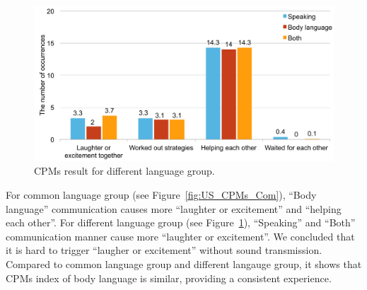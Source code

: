 \begin{figure}[!h]
\centering
\includegraphics[width=0.9\columnwidth]{Figures/US_CPMs_Dif.pdf}
\caption{CPMs result for different language group.}
\label{fig:US_CPMs_Dif}
\end{figure}

For common language group (see Figure~\ref{fig:US_CPMs_Com}),
``Body language'' communication causes more ``laughter or excitement'' and ``helping each other''.
For different language group (see Figure~\ref{fig:US_CPMs_Dif}), ``Speaking'' and ``Both'' communication manner cause more ``laughter or excitement''. We concluded that it is hard to trigger ``laugher or excitement'' without sound transmission. Compared to common language group and different langauge group, it shows that CPMs index of body language is similar, providing a consistent experience.

 




